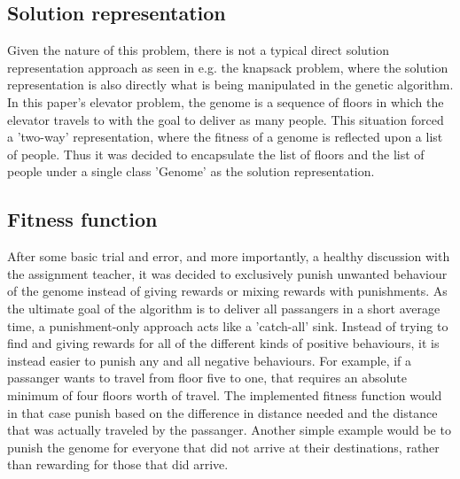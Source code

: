 \subsection{Solution representation}

    Given the nature of this problem, there is not a typical direct solution representation approach as seen in e.g. the knapsack problem, where the solution representation is also directly what is being manipulated in the genetic algorithm. In this paper's elevator problem, the genome is a sequence of floors in which the elevator travels to with the goal to deliver as many people. This situation forced a 'two-way' representation, where the fitness of a genome is reflected upon a list of people. Thus it was decided to encapsulate the list of floors and the list of people under a single class 'Genome' as the solution representation.

\subsection{Fitness function}

    After some basic trial and error, and more importantly, a healthy discussion with the assignment teacher, it was decided to exclusively punish unwanted behaviour of the genome instead of giving rewards or mixing rewards with punishments. As the ultimate goal of the algorithm is to deliver all passangers in a short average time, a punishment-only approach acts like a 'catch-all' sink. Instead of trying to find and giving rewards for all of the different kinds of positive behaviours, it is instead easier to punish any and all negative behaviours. For example, if a passanger wants to travel from floor five to one, that requires an absolute minimum of four floors worth of travel. The implemented fitness function would in that case punish based on the difference in distance needed and the distance that was actually traveled by the passanger. Another simple example would be to punish the genome for everyone that did not arrive at their destinations, rather than rewarding for those that did arrive.





